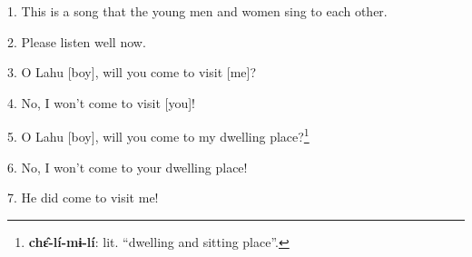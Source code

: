 \setcounter{footnote}{0}

1. This is a song that the young men and women sing to each other.

2. Please listen well now.

3. O Lahu [boy], will you come to visit [me]?

4. No, I won't come to visit [you]!

5. O Lahu [boy], will you come to my dwelling place?\footnote{\textbf{chɛ̂-lí-mɨ-lí}: lit. ``dwelling and sitting place''.}

6. No, I won't come to your dwelling place!

7. He did come to visit me!

